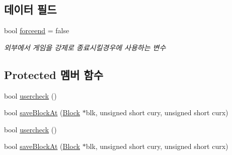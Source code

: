 \subsection*{데이터 필드}
\begin{DoxyCompactItemize}
\item 
bool \hyperlink{class_tetris_1_1_game_controller_a015411333b232483387d89f3ba0617e0}{forceend} = false
\begin{DoxyCompactList}\small\item\em 외부에서 게임을 강제로 종료시킬경우에 사용하는 변수 \end{DoxyCompactList}\end{DoxyCompactItemize}
\subsection*{Protected 멤버 함수}
\begin{DoxyCompactItemize}
\item 
bool \hyperlink{class_tetris_1_1_game_controller_ab96e22daad51119b35cbee8cfb7385ef}{usercheck} ()
\item 
bool \hyperlink{class_tetris_1_1_game_controller_adc067380df0f0da4ea4a358d00d6a123}{save\+Block\+At} (\hyperlink{class_tetris_1_1_block}{Block} $\ast$blk, unsigned short cury, unsigned short curx)
\item 
bool \hyperlink{class_tetris_1_1_game_controller_ab96e22daad51119b35cbee8cfb7385ef}{usercheck} ()
\item 
bool \hyperlink{class_tetris_1_1_game_controller_adc067380df0f0da4ea4a358d00d6a123}{save\+Block\+At} (\hyperlink{class_tetris_1_1_block}{Block} $\ast$blk, unsigned short cury, unsigned short curx)
\end{DoxyCompactItemize}
